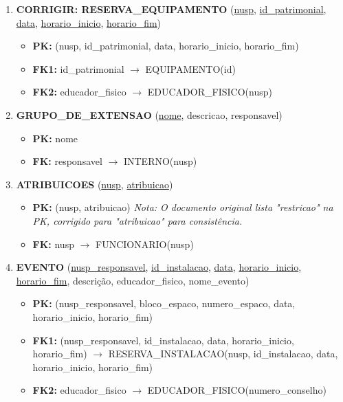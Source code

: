 \documentclass{article}
\begin{document}
\begin{enumerate}
    \item \textbf{CORRIGIR: RESERVA\_EQUIPAMENTO} (\underline{nusp}, \underline{id\_patrimonial}, \underline{data}, \underline{horario\_inicio}, \underline{horario\_fim})
        \begin{itemize}
            \item \textbf{PK:} (nusp, id\_patrimonial, data, horario\_inicio, horario\_fim)
            \item \textbf{FK1:} id\_patrimonial $\rightarrow$ EQUIPAMENTO(id)
            \item \textbf{FK2:} educador\_fisico $\rightarrow$ EDUCADOR\_FISICO(nusp)
        \end{itemize}

    \item \textbf{GRUPO\_DE\_EXTENSAO} (\underline{nome}, descricao, responsavel)
        \begin{itemize}
            \item \textbf{PK:} nome
            \item \textbf{FK:} responsavel $\rightarrow$ INTERNO(nusp)
        \end{itemize}

    \item \textbf{ATRIBUICOES} (\underline{nusp}, \underline{atribuicao})
        \begin{itemize}
            \item \textbf{PK:} (nusp, atribuicao) \textit{Nota: O documento original lista "restricao" na PK, corrigido para "atribuicao" para consistência.}
            \item \textbf{FK:} nusp $\rightarrow$ FUNCIONARIO(nusp)
        \end{itemize}

    \item \textbf{EVENTO} (\underline{nusp\_responsavel}, \underline{id\_instalacao}, \underline{data}, \underline{horario\_inicio}, \underline{horario\_fim}, descrição, educador\_fisico, nome\_evento)
        \begin{itemize}
            \item \textbf{PK:} (nusp\_responsavel, bloco\_espaco, numero\_espaco, data, horario\_inicio, horario\_fim)
            \item \textbf{FK1:} (nusp\_responsavel, id\_instalacao, data, horario\_inicio, horario\_fim) $\rightarrow$ RESERVA\_INSTALACAO(nusp, id\_instalacao, data, horario\_inicio, horario\_fim)
            \item \textbf{FK2:} educador\_fisico $\rightarrow$ EDUCADOR\_FISICO(numero\_conselho)
        \end{itemize}


\end{enumerate}
\end{document}
